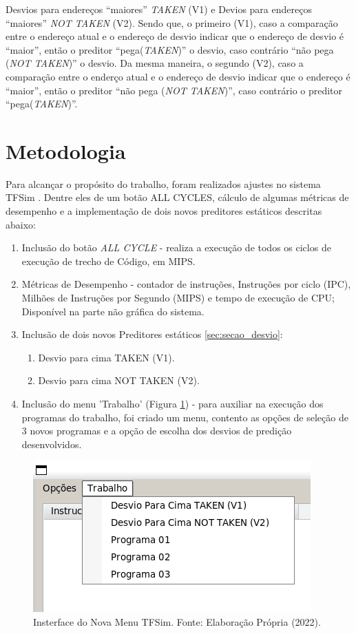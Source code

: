 \documentclass[12pt]{article}
\begin{document}
Desvios para endereços ``maiores'' \textit{TAKEN} (V1) e Devios para endereços ``maiores'' \textit{NOT TAKEN} (V2). Sendo que, o primeiro (V1), caso a comparação entre o endereço atual e o endereço de desvio indicar que o endereço de desvio é ``maior'', então o preditor ``pega(\textit{TAKEN})'' o desvio, caso contrário ``não pega (\textit{NOT TAKEN})'' o desvio. Da mesma maneira, o segundo (V2), caso a comparação entre o enderço atual e o endereço de desvio indicar que o endereço é ``maior'', então o preditor ``não pega (\textit{NOT TAKEN})'', caso contrário o preditor ``pega(\textit{TAKEN})''.


\section{Metodologia}

Para alcançar o propósito do trabalho, foram realizados ajustes no sistema TFSim \cite{lucas:2019}. Dentre eles de um botão ALL CYCLES, cálculo de algumas métricas de desempenho e a implementação de dois novos preditores estáticos descritas abaixo:

\begin{enumerate}
  \item Inclusão do botão \textit{ALL CYCLE} - realiza a execução de todos os ciclos de execução de trecho de Código, em MIPS.
  \item Métricas de Desempenho - contador de instruções, Instruções por ciclo (IPC), Milhões de Instruções por Segundo (MIPS) e tempo de execução de CPU; Disponível na parte não gráfica do sistema.
  \item Inclusão de dois novos Preditores estáticos \ref{sec:secao_desvio}:
        \begin{enumerate}
          \item Desvio para cima TAKEN (V1).
          \item Desvio para cima NOT TAKEN (V2).
        \end{enumerate}
  \item Inclusão do menu 'Trabalho' (Figura \ref{fig_menutfsim}) - para auxiliar na execução dos programas do trabalho, foi criado um menu, contento as opções de seleção de 3 novos programas e a opção de escolha dos desvios de predição desenvolvidos.
\end{enumerate}

\begin{figure}[h]
  \centering
  \includegraphics[width=.5\textwidth]{img/fig_menutfsim.png}
  \caption{Insterface do Nova Menu TFSim. Fonte: Elaboração Própria (2022).}
  \label{fig_menutfsim}
\end{figure}
\end{document}

